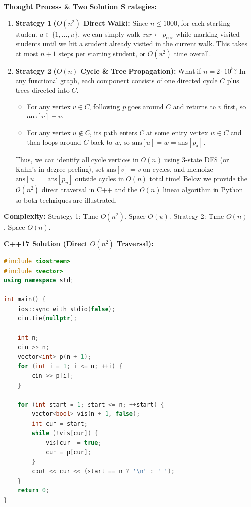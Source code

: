 \documentclass[11pt]{article}
\begin{document}
\textbf{Thought Process \& Two Solution Strategies:}
\begin{enumerate}
    \item \textbf{Strategy 1 ($O(n^2)$ Direct Walk):} Since $n \le 1000$, for each starting student $a \in \{1, \dots, n\}$, we can simply walk $cur \leftarrow p_{cur}$ while marking visited students until we hit a student already visited in the current walk. This takes at most $n + 1$ steps per starting student, or $O(n^2)$ time overall.
    \item \textbf{Strategy 2 ($O(n)$ Cycle \& Tree Propagation):} What if $n = 2 \cdot 10^5$? In any functional graph, each component consists of one directed cycle $C$ plus trees directed into $C$.
    \begin{itemize}
        \item For any vertex $v \in C$, following $p$ goes around $C$ and returns to $v$ first, so $\text{ans}[v] = v$.
        \item For any vertex $u \notin C$, its path enters $C$ at some entry vertex $w \in C$ and then loops around $C$ back to $w$, so $\text{ans}[u] = w = \text{ans}[p_u]$.
    \end{itemize}
    Thus, we can identify all cycle vertices in $O(n)$ using 3-state DFS (or Kahn's in-degree peeling), set $\text{ans}[v] = v$ on cycles, and memoize $\text{ans}[u] = \text{ans}[p_u]$ outside cycles in $O(n)$ total time! Below we provide the $O(n^2)$ direct traversal in C++ and the $O(n)$ linear algorithm in Python so both techniques are illustrated.
\end{enumerate}

\textbf{Complexity:} Strategy 1: Time $O(n^2)$, Space $O(n)$. Strategy 2: Time $O(n)$, Space $O(n)$.

\textbf{C++17 Solution (Direct $O(n^2)$ Traversal):}
\begin{lstlisting}[language=C++]
#include <iostream>
#include <vector>
using namespace std;

int main() {
    ios::sync_with_stdio(false);
    cin.tie(nullptr);

    int n;
    cin >> n;
    vector<int> p(n + 1);
    for (int i = 1; i <= n; ++i) {
        cin >> p[i];
    }

    for (int start = 1; start <= n; ++start) {
        vector<bool> vis(n + 1, false);
        int cur = start;
        while (!vis[cur]) {
            vis[cur] = true;
            cur = p[cur];
        }
        cout << cur << (start == n ? '\n' : ' ');
    }
    return 0;
}
\end{lstlisting}
\end{document}
